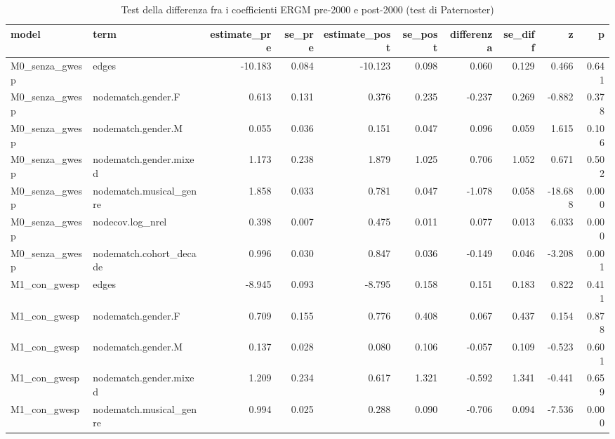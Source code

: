 \begin{table}
\centering
\caption{Test della differenza fra i coefficienti ERGM pre-2000 e post-2000 (test di Paternoster)}
\label{tab:t4_ergm_differenza_epoche}
\begin{tabular}{llrrrrrrrr}
\toprule
           model &                    term &  estimate\_pre &  se\_pre &  estimate\_post &  se\_post &  differenza &  se\_diff &       z &     p \\
\midrule
  M0\_senza\_gwesp &                   edges &       -10.183 &   0.084 &        -10.123 &    0.098 &       0.060 &    0.129 &   0.466 & 0.641 \\
  M0\_senza\_gwesp &      nodematch.gender.F &         0.613 &   0.131 &          0.376 &    0.235 &      -0.237 &    0.269 &  -0.882 & 0.378 \\
  M0\_senza\_gwesp &      nodematch.gender.M &         0.055 &   0.036 &          0.151 &    0.047 &       0.096 &    0.059 &   1.615 & 0.106 \\
  M0\_senza\_gwesp &  nodematch.gender.mixed &         1.173 &   0.238 &          1.879 &    1.025 &       0.706 &    1.052 &   0.671 & 0.502 \\
  M0\_senza\_gwesp & nodematch.musical\_genre &         1.858 &   0.033 &          0.781 &    0.047 &      -1.078 &    0.058 & -18.688 & 0.000 \\
  M0\_senza\_gwesp &        nodecov.log\_nrel &         0.398 &   0.007 &          0.475 &    0.011 &       0.077 &    0.013 &   6.033 & 0.000 \\
  M0\_senza\_gwesp & nodematch.cohort\_decade &         0.996 &   0.030 &          0.847 &    0.036 &      -0.149 &    0.046 &  -3.208 & 0.001 \\
    M1\_con\_gwesp &                   edges &        -8.945 &   0.093 &         -8.795 &    0.158 &       0.151 &    0.183 &   0.822 & 0.411 \\
    M1\_con\_gwesp &      nodematch.gender.F &         0.709 &   0.155 &          0.776 &    0.408 &       0.067 &    0.437 &   0.154 & 0.878 \\
    M1\_con\_gwesp &      nodematch.gender.M &         0.137 &   0.028 &          0.080 &    0.106 &      -0.057 &    0.109 &  -0.523 & 0.601 \\
    M1\_con\_gwesp &  nodematch.gender.mixed &         1.209 &   0.234 &          0.617 &    1.321 &      -0.592 &    1.341 &  -0.441 & 0.659 \\
    M1\_con\_gwesp & nodematch.musical\_genre &         0.994 &   0.025 &          0.288 &    0.090 &      -0.706 &    0.094 &  -7.536 & 0.000 \\

\end{tabular}
\end{table}
